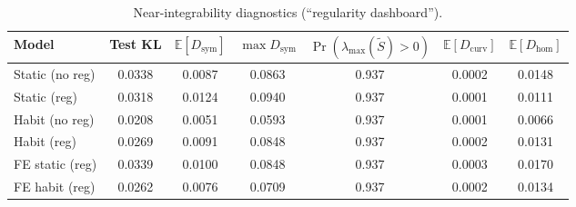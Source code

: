 \begin{table}[t]
\centering
\caption{Near-integrability diagnostics (``regularity dashboard'').}
\label{tab:regularity_dashboard}
\begin{tabular}{lcccccc}
\toprule
Model & Test KL & $\mathbb E[D_{\mathrm{sym}}]$ & $\max D_{\mathrm{sym}}$ & $\Pr(\lambda_{\max}(\tilde S)>0)$ & $\mathbb E[D_{\mathrm{curv}}]$ & $\mathbb E[D_{\mathrm{hom}}]$ \\
\midrule
Static (no reg) & 0.0338 & 0.0087 & 0.0863 & 0.937 & 0.0002 & 0.0148 \\
Static (reg) & 0.0318 & 0.0124 & 0.0940 & 0.937 & 0.0001 & 0.0111 \\
Habit (no reg) & 0.0208 & 0.0051 & 0.0593 & 0.937 & 0.0001 & 0.0066 \\
Habit (reg) & 0.0269 & 0.0091 & 0.0848 & 0.937 & 0.0002 & 0.0131 \\
\addlinespace
FE static (reg) & 0.0339 & 0.0100 & 0.0848 & 0.937 & 0.0003 & 0.0170 \\
FE habit (reg) & 0.0262 & 0.0076 & 0.0709 & 0.937 & 0.0002 & 0.0134 \\
\bottomrule
\end{tabular}
\end{table}
